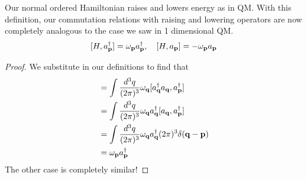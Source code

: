 \begin{thm} 
Our normal ordered Hamiltonian raises and lowers energy as in QM. 
With this definition, our commutation relations with raising and lowering operators are now completely analogous to the case we saw in 1 dimensional QM. 
\[ 
[ H,  a^\dagger_{ \mathbf{  p  }} ]  = \omega_\mathbf{ p} a^\dagger_{ \mathbf{  p  }}, \quad [ H, a_{ \mathbf{  p  }} ] = - \omega_\mathbf{ p } a_{ \mathbf{  p  }} 
\] 
\begin{proof} 
We substitute in our definitions to find that 
\begin{align*} 
[ H, \crea{ p } ] &= \int \frac{ d^3 q }{ ( 2 \pi )^ 3 } \freq{ q} [ \crea{ q } \ann{q} , \crea{ p } ] \\
& =  \int \frac{ d^3 q }{ ( 2 \pi )^ 3 } \freq{q} \crea{q} [ \ann{ q}, \crea{ p} ] \\
&=   \int \frac{ d^3 q }{ ( 2 \pi )^ 3 } \freq{ q } \crea{ q} ( 2 \pi )^3  \delta ( \ve{ q - p } ) \\
&= \freq{ p } \crea{ p } 
\end{align*} 
The other case is completely similar!
\end{proof} 
\end{thm} 

